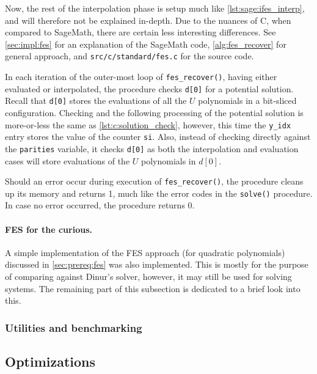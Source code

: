 Now, the rest of the interpolation phase is setup much like \cref{lst:sage:ifes_interp}, and will therefore not be explained in-depth. Due to the nuances of C, when compared to SageMath, there are certain less interesting differences. See \cref{sec:impl:fes} for an explanation of the SageMath code, \cref{alg:fes_recover} for general approach, and \texttt{src/c/standard/fes.c} for the source code.

In each iteration of the outer-most loop of \texttt{fes\_recover()}, having either evaluated or interpolated, the procedure checks \texttt{d[0]} for a potential solution. Recall that \texttt{d[0]} stores the evaluations of all the $U$ polynomials in a bit-sliced configuration. Checking and the following processing of the potential solution is more-or-less the same as \cref{lst:c:solution_check}, however, this time the \texttt{y\_idx} entry stores the value of the counter \texttt{si}. Also, instead of checking directly against the \texttt{parities} variable, it checks \texttt{d[0]} as both the interpolation and evaluation cases will store evaluations of the $U$ polynomials in $d[0]$.

Should an error occur during execution of \texttt{fes\_recover()}, the procedure cleans up its memory and returns 1, much like the error codes in the \texttt{solve()} procedure. In case no error occurred, the procedure returns 0.

\paragraph{FES for the curious.} A simple implementation of the FES approach (for quadratic polynomials) discussed in \cref{sec:prereq:fes} was also implemented. This is mostly for the purpose of comparing against Dinur's solver, however, it may still be used for solving systems. The remaining part of this subsection is dedicated to a brief look into this.

\subsubsection{Utilities and benchmarking}

\subsection{Optimizations} \label{sec:impl:opt}


